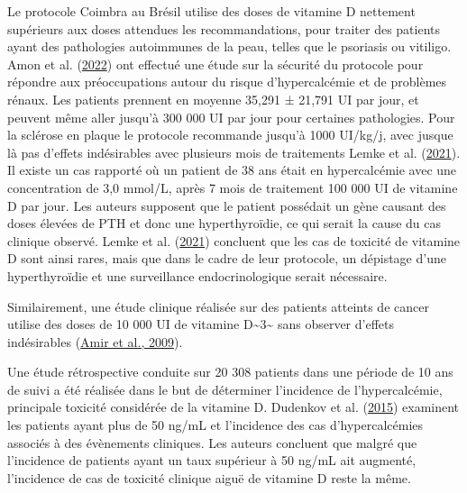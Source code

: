 \documentclass[
  a4paper,
  DIV=11,
  numbers=noendperiod,
  listof=totoc]{scrreprt}
\begin{document}
Le protocole Coimbra au Brésil utilise des doses de vitamine D nettement
supérieurs aux doses attendues les recommandations, pour traiter des
patients ayant des pathologies autoimmunes de la peau, telles que le
psoriasis ou vitiligo. Amon et al.
(\protect\hyperlink{ref-Amon.2022}{2022}) ont effectué une étude sur la
sécurité du protocole pour répondre aux préoccupations autour du risque
d'hypercalcémie et de problèmes rénaux. Les patients prennent en moyenne
35,291 ± 21,791 UI par jour, et peuvent même aller jusqu'à 300 000 UI
par jour pour certaines pathologies. Pour la sclérose en plaque le
protocole recommande jusqu'à 1000 UI/kg/j, avec jusque là pas d'effets
indésirables avec plusieurs mois de traitements Lemke et al.
(\protect\hyperlink{ref-Lemke.2021}{2021}). Il existe un cas rapporté où
un patient de 38 ans était en hypercalcémie avec une concentration de
3,0 mmol/L, après 7 mois de traitement 100 000 UI de vitamine D par
jour. Les auteurs supposent que le patient possédait un gène causant des
doses élevées de PTH et donc une hyperthyroïdie, ce qui serait la cause
du cas clinique observé. Lemke et al.
(\protect\hyperlink{ref-Lemke.2021}{2021}) concluent que les cas de
toxicité de vitamine D sont ainsi rares, mais que dans le cadre de leur
protocole, un dépistage d'une hyperthyroïdie et une surveillance
endocrinologique serait nécessaire.

Similairement, une étude clinique réalisée sur des patients atteints de
cancer utilise des doses de 10 000 UI de vitamine
D\textasciitilde3\textasciitilde{} sans observer d'effets indésirables
(\protect\hyperlink{ref-Amir.2009}{Amir et al., 2009}).

Une étude rétrospective conduite sur 20 308 patients dans une période de
10 ans de suivi a été réalisée dans le but de déterminer l'incidence de
l'hypercalcémie, principale toxicité considérée de la vitamine D.
Dudenkov et al. (\protect\hyperlink{ref-Dudenkov.2015}{2015}) examinent
les patients ayant plus de 50 ng/mL et l'incidence des cas
d'hypercalcémies associés à des évènements cliniques. Les auteurs
concluent que malgré que l'incidence de patients ayant un taux supérieur
à 50 ng/mL ait augmenté, l'incidence de cas de toxicité clinique aiguë
de vitamine D reste la même.
\end{document}
